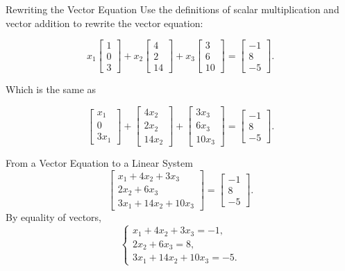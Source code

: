 \begin{frame}{Rewriting the Vector Equation}
    Use the definitions of scalar multiplication and vector addition to rewrite the vector equation:

  \[
    x_1\begin{bmatrix}1\\0\\3\end{bmatrix}
    +x_2\begin{bmatrix}4\\2\\14\end{bmatrix}
    +x_3\begin{bmatrix}3\\6\\10\end{bmatrix}
    =\begin{bmatrix}-1\\8\\-5\end{bmatrix}.
  \]

  \pause

  Which is the same as 

  \[
    \begin{bmatrix}x_1\\0\\3x_1\end{bmatrix}
    +\begin{bmatrix}4x_2\\2x_2\\14x_2\end{bmatrix}
    +\begin{bmatrix}3x_3\\6x_3\\10x_3\end{bmatrix}
    =\begin{bmatrix}-1\\8\\-5\end{bmatrix}.
  \]
\end{frame}

\begin{frame}{From a Vector Equation to a Linear System}
  \[
    \begin{bmatrix}
      x_1+4x_2+3x_3\\
      2x_2+6x_3\\
      3x_1+14x_2+10x_3
    \end{bmatrix}
    =
    \begin{bmatrix}-1\\8\\-5\end{bmatrix}.
  \]
  By equality of vectors,
  \[
    \begin{cases}
      x_1+4x_2+3x_3=-1,\\
      2x_2+6x_3=8,\\
      3x_1+14x_2+10x_3=-5.
    \end{cases}
  \]
\end{frame}

